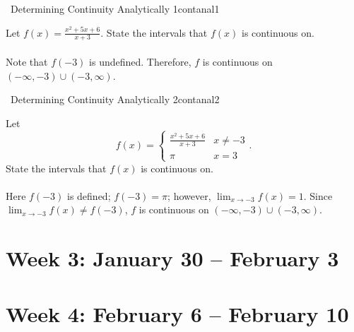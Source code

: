         \begin{example}{\Difficulty\,\Difficulty\,\,Determining Continuity Analytically 1}{contanal1}

            Let \(f(x)=\frac{x^2+5x+6}{x+3}\). State the intervals that \(f(x)\) is continuous on.
            \\
            \\
            Note that \(f(-3)\) is undefined. Therefore, \(f\) is continuous on \((-\infty,-3)\cup(-3,\infty)\).

        \end{example}
        \pagebreak
        \begin{example}{\Difficulty\,\Difficulty\,\,Determining Continuity Analytically 2}{contanal2}

            Let
            \begin{equation*}
                f(x)=\begin{cases}
                    \frac{x^2+5x+6}{x+3} & x\neq -3 \\
                    \pi & x=3
                \end{cases}.
            \end{equation*}
            State the intervals that \(f(x)\) is continuous on.
            \\
            \\
            Here \(f(-3)\) is defined; \(f(-3)=\pi\); however, \(\lim_{x\to-3}f(x)=1\). Since \(\lim_{x\to-3}f(x)\neq f(-3)\), \(f\) is continuous on \((-\infty,-3)\cup(-3,\infty)\).

        \end{example}

\pagebreak

\section{Week 3: January 30 -- February 3}

\section{Week 4: February 6 -- February 10}